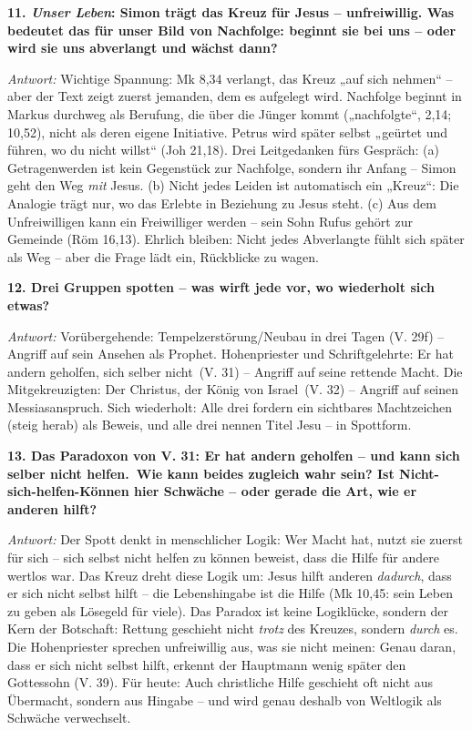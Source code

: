 \documentclass[12pt,a4paper]{article}
\newcommand{\frage}[1]{\par\vspace{0.7em}\noindent\textbf{#1}\par}
\newcommand{\antwort}[1]{\par\noindent\textit{Antwort:} #1\par}
\begin{document}
\frage{11. \emph{Unser Leben}: Simon trägt das Kreuz für Jesus -- unfreiwillig. Was bedeutet das für unser Bild von Nachfolge: beginnt sie bei uns -- oder wird sie uns abverlangt und wächst dann?}
\antwort{Wichtige Spannung: Mk 8,34 verlangt, das Kreuz „auf sich nehmen“ -- aber der Text zeigt zuerst jemanden, dem es aufgelegt wird. Nachfolge beginnt in Markus durchweg als Berufung, die über die Jünger kommt („nachfolgte“, 2,14; 10,52), nicht als deren eigene Initiative. Petrus wird später selbst „geürtet und führen, wo du nicht willst“ (Joh 21,18). Drei Leitgedanken fürs Gespräch: (a) Getragenwerden ist kein Gegenstück zur Nachfolge, sondern ihr Anfang -- Simon geht den Weg \emph{mit} Jesus. (b) Nicht jedes Leiden ist automatisch ein „Kreuz“: Die Analogie trägt nur, wo das Erlebte in Beziehung zu Jesus steht. (c) Aus dem Unfreiwilligen kann ein Freiwilliger werden -- sein Sohn Rufus gehört zur Gemeinde (Röm 16,13). Ehrlich bleiben: Nicht jedes Abverlangte fühlt sich später als Weg -- aber die Frage lädt ein, Rückblicke zu wagen.}

\frage{12. Drei Gruppen spotten -- was wirft jede vor, wo wiederholt sich etwas?}
\antwort{Vorübergehende: Tempelzerstörung/Neubau in drei Tagen (V. 29f) -- Angriff auf sein Ansehen als Prophet. Hohenpriester und Schriftgelehrte: \glqq Er hat andern geholfen, sich selber nicht\grqq\ (V. 31) -- Angriff auf seine rettende Macht. Die Mitgekreuzigten: \glqq Der Christus, der König von Israel\grqq\ (V. 32) -- Angriff auf seinen Messiasanspruch. Sich wiederholt: Alle drei fordern ein sichtbares Machtzeichen (\glqq steig herab\grqq{}) als Beweis, und alle drei nennen Titel Jesu -- in Spottform.}

\frage{13. \textbf{Das Paradoxon von V. 31}: \glqq Er hat andern geholfen -- und kann sich selber nicht helfen.\grqq\ Wie kann beides zugleich wahr sein? Ist Nicht-sich-helfen-Können hier Schwäche -- oder gerade die Art, wie er anderen hilft?}
\antwort{Der Spott denkt in menschlicher Logik: Wer Macht hat, nutzt sie zuerst für sich -- sich selbst nicht helfen zu können beweist, dass die Hilfe für andere wertlos war. Das Kreuz dreht diese Logik um: Jesus hilft anderen \emph{dadurch}, dass er sich nicht selbst hilft -- die Lebenshingabe ist die Hilfe (Mk 10,45: \glqq sein Leben zu geben als Lösegeld für viele\grqq{}). Das Paradox ist keine Logiklücke, sondern der Kern der Botschaft: Rettung geschieht nicht \emph{trotz} des Kreuzes, sondern \emph{durch} es. Die Hohenpriester sprechen unfreiwillig aus, was sie nicht meinen: Genau daran, dass er sich nicht selbst hilft, erkennt der Hauptmann wenig später den Gottessohn (V. 39). Für heute: Auch christliche Hilfe geschieht oft nicht aus Übermacht, sondern aus Hingabe -- und wird genau deshalb von Weltlogik als Schwäche verwechselt.}
\end{document}
